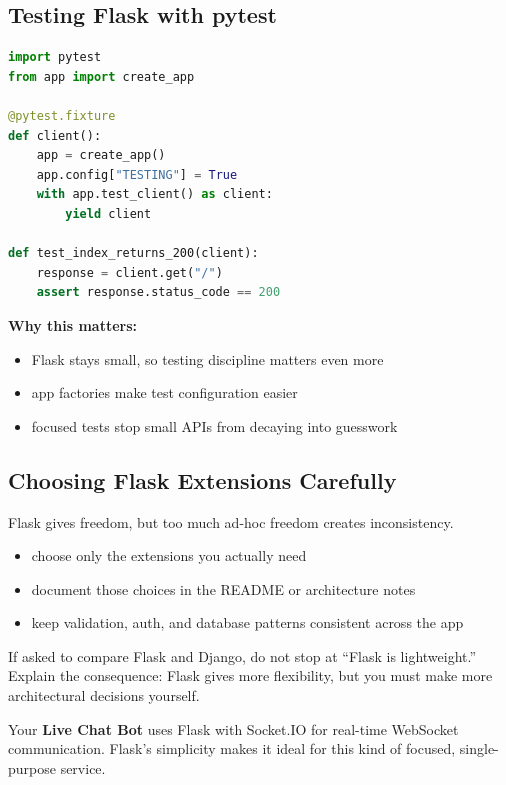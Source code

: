 \documentclass[12pt, a4paper, oneside]{book}
\begin{document}
\subsection{Testing Flask with pytest}

\begin{lstlisting}[language=Python, caption={Simple Flask pytest example}]
import pytest
from app import create_app

@pytest.fixture
def client():
    app = create_app()
    app.config["TESTING"] = True
    with app.test_client() as client:
        yield client

def test_index_returns_200(client):
    response = client.get("/")
    assert response.status_code == 200
\end{lstlisting}

\textbf{Why this matters:}
\begin{itemize}[leftmargin=2em]
    \item Flask stays small, so testing discipline matters even more
    \item app factories make test configuration easier
    \item focused tests stop small APIs from decaying into guesswork
\end{itemize}

\subsection{Choosing Flask Extensions Carefully}

Flask gives freedom, but too much ad-hoc freedom creates inconsistency.

\begin{itemize}[leftmargin=2em]
    \item choose only the extensions you actually need
    \item document those choices in the README or architecture notes
    \item keep validation, auth, and database patterns consistent across the app
\end{itemize}

\begin{examtipbox}
If asked to compare Flask and Django, do not stop at ``Flask is lightweight.'' Explain the consequence: Flask gives more flexibility, but you must make more architectural decisions yourself.
\end{examtipbox}

\begin{projectbox}
Your \textbf{Live Chat Bot} uses Flask with Socket.IO for real-time WebSocket communication. Flask's simplicity makes it ideal for this kind of focused, single-purpose service.
\end{projectbox}
\end{document}
